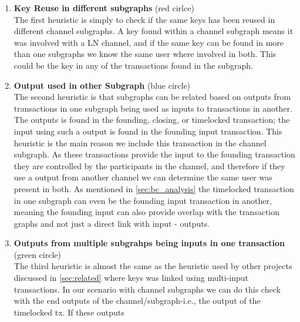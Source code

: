 \begin{enumerate}
    \item \textbf{Key Reuse in different subgraphs} (red cirlce)\\
    The first heuristic is simply to check if the same keys has been reused in different channel subgraphs.  
A key found within a channel subgraph means it was involved with a LN channel, and if the same key can be found in more than one subgraphs we know the same user where involved in both.
This could be the key in any of the transactions found in the subgraph.
    
    \item \textbf{Output used in other Subgraph} (blue circle) \\
 The second heuristic is that subgraphs can be related based on outputs from transactions in one subgraph being used as inputs to transactions in another. The outputs is found in the founding, closing, or timelocked transaction; the input using such a output is found in the founding input transaction. This heuristic is the main reason we include this transaction in the channel subgraph. As these transactions provide the input to the founding transaction they are controlled by the participants in the channel, and therefore if they use a output from another channel we can determine the same user was present in both. As mentioned in \cref{sec:bc_analysis} the timelocked transaction in one subgraph can even be the founding input transaction in another, meaning the founding input can also provide overlap with the transaction graphs and not just a direct link with input - outputs.
    
    \item \textbf{Outputs from multiple subgrahps being inputs in one transaction} (green circle) \\
 The third heuristic is almost the same as the heuristic used by other projects discussed in \cref{sec:related} where keys was linked using multi-input transactions. 
 In our scenario with channel subgraphs we can do this check with the end outputs of the channel/subgraph-i.e., the output of the timelocked tx. If these outputs 
    
\end{enumerate}

